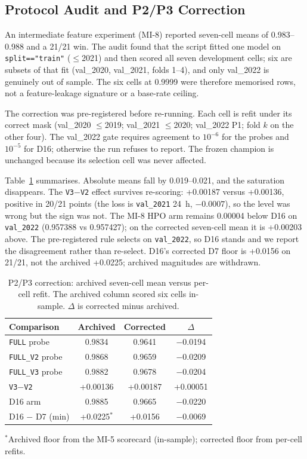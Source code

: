 \documentclass[conference]{IEEEtran}
\begin{document}
\subsection{Protocol Audit and P2/P3 Correction}

An intermediate feature experiment (MI-8) reported seven-cell means of 0.983--0.988 and a 21/21 win. The audit found that the script fitted one model on \texttt{split=="train"} ($\leq$2021) and then scored all seven development cells; six are subsets of that fit (val\_2020, val\_2021, folds 1--4), and only val\_2022 is genuinely out of sample. The six cells at 0.9999 were therefore memorised rows, not a feature-leakage signature or a base-rate ceiling.

The correction was pre-registered before re-running. Each cell is refit under its correct mask (val\_2020 $\leq$2019; val\_2021 $\leq$2020; val\_2022 P1; fold $k$ on the other four). The val\_2022 gate requires agreement to $10^{-6}$ for the probes and $10^{-5}$ for D16; otherwise the run refuses to report. The frozen champion is unchanged because its selection cell was never affected.

Table~\ref{tab:correction} summarises. Absolute means fall by 0.019--0.021, and the saturation disappears. The \texttt{V3}$-$\texttt{V2} effect survives re-scoring: +0.00187 versus +0.00136, positive in 20/21 points (the loss is \texttt{val\_2021} 24~h, $-0.0007$), so the level was wrong but the sign was not. The MI-8 HPO arm remains 0.00004 below D16 on \texttt{val\_2022} (0.957388 vs 0.957427); on the corrected seven-cell mean it is +0.00203 above. The pre-registered rule selects on \texttt{val\_2022}, so D16 stands and we report the disagreement rather than re-select. D16's corrected D7 floor is +0.0156 on 21/21, not the archived +0.0225; archived magnitudes are withdrawn.

\begin{table}[t]
\centering
\caption{P2/P3 correction: archived seven-cell mean versus per-cell refit. The archived column scored six cells in-sample. $\Delta$ is corrected minus archived.}
\label{tab:correction}
\scriptsize
\setlength{\tabcolsep}{3.2pt}
\begin{tabular}{l c c c}
\toprule
Comparison & Archived & Corrected & $\Delta$ \\
\midrule
\texttt{FULL} probe & 0.9834 & 0.9641 & $-$0.0194 \\
\texttt{FULL\_V2} probe & 0.9868 & 0.9659 & $-$0.0209 \\
\texttt{FULL\_V3} probe & 0.9882 & 0.9678 & $-$0.0204 \\
\texttt{V3}$-$\texttt{V2} & +0.00136 & +0.00187 & +0.00051 \\
D16 arm & 0.9885 & 0.9665 & $-$0.0220 \\
D16 $-$ D7 (min) & +0.0225$^{*}$ & +0.0156 & $-$0.0069 \\
\bottomrule
\end{tabular}

\vspace{2pt}
{\scriptsize $^{*}$Archived floor from the MI-5 scorecard (in-sample); corrected floor from per-cell refits.\par}
\end{table}
\end{document}
